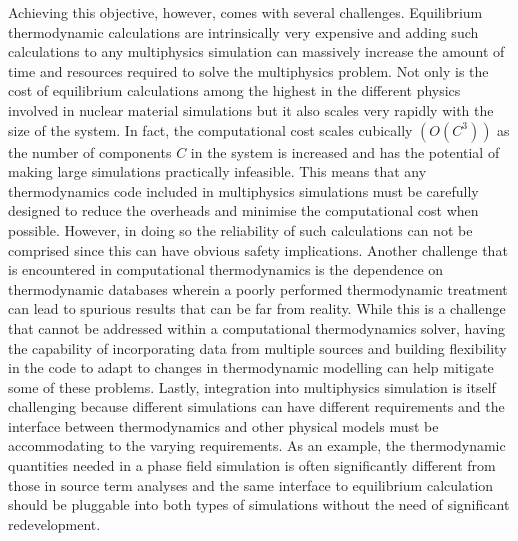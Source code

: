 	Achieving this objective, however, comes with several challenges. Equilibrium thermodynamic calculations are intrinsically very expensive and adding such calculations to any multiphysics simulation can massively increase the amount of time and resources required to solve the multiphysics problem. Not only is the cost of equilibrium calculations among the highest in the different physics involved in nuclear material simulations but it also scales very rapidly with the size of the system. In fact, the computational cost scales cubically $\left(\mathit{O}(C^3)\right)$ as the number of components $C$ in the system is increased and has the potential of making large simulations practically infeasible. This means that any thermodynamics code included in multiphysics simulations must be carefully designed to reduce the overheads and minimise the computational cost when possible. However, in doing so the reliability of such calculations can not be comprised since this can have obvious safety implications. Another challenge that is encountered in computational thermodynamics is the dependence on thermodynamic databases wherein a poorly performed thermodynamic treatment can lead to spurious results that can be far from reality. While this is a challenge that cannot be addressed within a computational thermodynamics solver, having the capability of incorporating data from multiple sources and building flexibility in the code to adapt to changes in thermodynamic modelling can help mitigate some of these problems. Lastly, integration into multiphysics simulation is itself challenging because different simulations can have different requirements and the interface between thermodynamics and other physical models must be accommodating to the varying requirements. As an example, the thermodynamic quantities needed in a phase field simulation is often significantly different from those in source term analyses and the same interface to equilibrium calculation should be pluggable into both types of simulations without the need of significant redevelopment.
	
